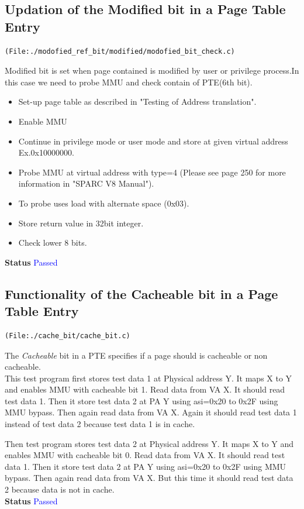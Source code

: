 \documentclass[12pt,a4paper]{article}
\begin{document}
\subsection{Updation of the Modified bit in a Page Table Entry}
\begin{lstlisting}
(File:./modofied_ref_bit/modified/modofied_bit_check.c)
\end{lstlisting}
Modified bit is set when page contained is modified by user or privilege process.In this case we need to probe MMU and check contain of PTE(6th bit).
\begin{itemize}
\item Set-up page table as described in "Testing of Address translation". 
\item Enable MMU
\item Continue in privilege mode or user mode  and store at given virtual address Ex.0x10000000.
\item Probe MMU at virtual address with type=4 (Please see page 250 for more information in "SPARC V8 Manual"). 
\item To probe uses load with alternate space (0x03).
\item Store return value in 32bit integer.
\item Check lower 8 bits.
\end{itemize}
\textbf{Status} \textcolor{blue}{Passed}

\subsection{Functionality of the Cacheable bit in a Page Table Entry}
\begin{lstlisting}
(File:./cache_bit/cache_bit.c)
\end{lstlisting}
The {\em Cacheable} bit in a PTE specifies if a page should is cacheable or non cacheable.\\
This test program first stores test data 1 at Physical address Y. It maps X to Y and enables MMU with cacheable bit 1. Read data from VA X. It should read test data 1.   
Then it store test data 2 at PA Y using asi=0x20 to 0x2F using MMU bypass. Then again read data from VA X. Again it should read test data 1 instead of test data 2 because test data 1 is in cache.

Then test program stores test data 2 at Physical address Y. It maps X to Y and enables MMU with cacheable bit 0. Read data from VA X. It should read test data 1.   
Then it store test data 2 at PA Y using asi=0x20 to 0x2F using MMU bypass. Then again read data from VA X. But this time it should read test data 2 because data is not in cache.\\
\textbf{Status} \textcolor{blue}{Passed}
\end{document}
